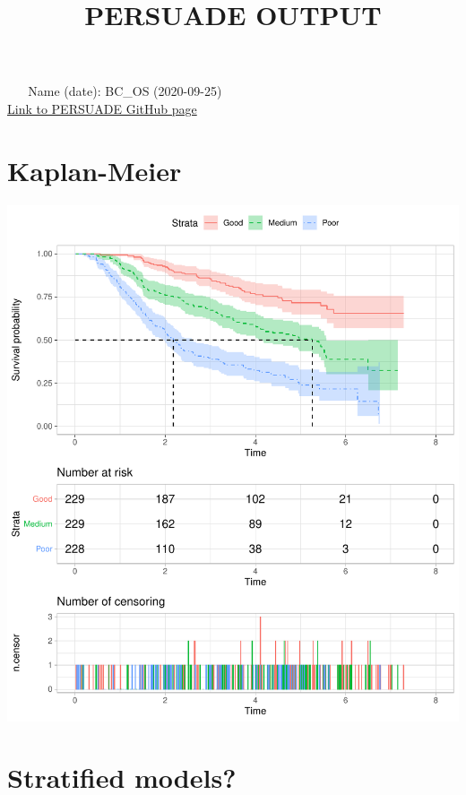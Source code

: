 \documentclass[]{article}
\title{PERSUADE OUTPUT}
\author{}
\date{\vspace{-2.5em}}
\begin{document}
\maketitle

{
\hypersetup{linkcolor=black}
\setcounter{tocdepth}{2}
\tableofcontents
}
~ ~ Name (date): BC\_OS
(2020-09-25)\\[2\baselineskip]\href{https://github.com/Bram-R/PERSUADE}{Link
to PERSUADE GitHub page} \newpage

\section{Kaplan-Meier}\label{kaplan-meier}

\begin{flushleft}\includegraphics{images/plot_KM-1} \end{flushleft}

\newpage

\section{Stratified models?}\label{stratified-models}
\end{document}

